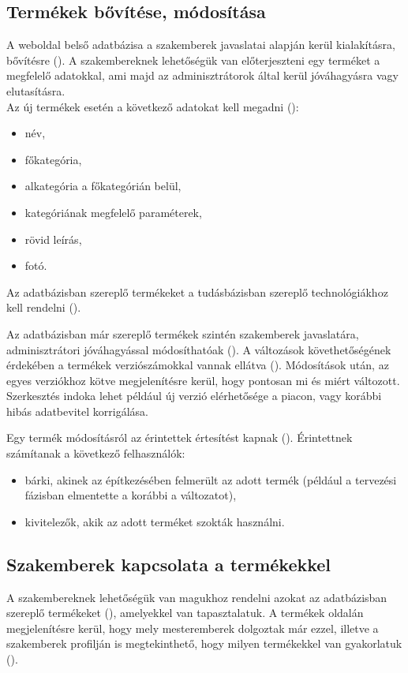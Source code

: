 \clearpage
\subsection{Termékek bővítése, módosítása}
A weboldal belső adatbázisa a szakemberek javaslatai alapján kerül kialakításra, bővítésre (). A szakembereknek lehetőségük van előterjeszteni egy terméket a megfelelő adatokkal, ami majd az adminisztrátorok által kerül jóváhagyásra vagy elutasításra. \\
Az új termékek esetén a következő adatokat kell megadni ():
\begin{itemize}
    \item név,
    \item főkategória,
    \item alkategória a főkategórián belül,
    \item kategóriának megfelelő paraméterek,
    \item rövid leírás,
    \item fotó.
\end{itemize}

 Az adatbázisban szereplő termékeket a tudásbázisban szereplő technológiák\-hoz kell rendelni ().

Az adatbázisban már szereplő termékek szintén szakemberek javaslatára, adminisztrátori jóváhagyással módosíthatóak (). A változások követhetőségének érdekében a termékek verziószámokkal vannak ellátva (). Módosítások után, az egyes verziókhoz kötve megjelenítésre kerül, hogy pontosan mi és miért változott. Szerkesztés indoka lehet például új verzió elérhetősége a piacon, vagy korábbi hibás adatbevitel korrigálása.


Egy termék módosításról az érintettek értesítést kapnak (). Érintettnek számí\-tanak a következő felhasználók:
\begin{itemize}
    \item bárki, akinek az építkezésében felmerült az adott termék (például a tervezési fázisban elmentette a korábbi a változatot),
    \item kivitelezők, akik az adott terméket szokták használni.
\end{itemize}


\subsection{Szakemberek kapcsolata a termékekkel}
A szakembereknek lehetőségük van magukhoz rendelni azokat az adatbázisban szereplő termékeket (), amelyekkel van tapasztalatuk. A termékek oldalán megjelenítésre kerül, hogy mely mesteremberek dolgoztak már ezzel, illetve a szakemberek profilján is megtekinthető, hogy milyen termékekkel van gyakorlatuk ().

